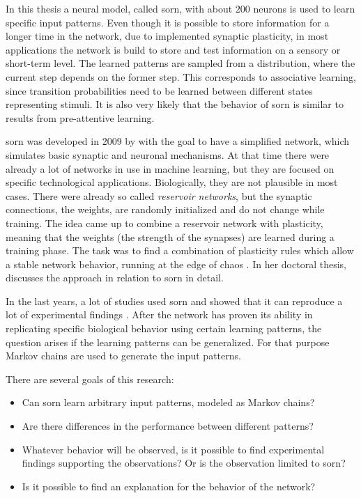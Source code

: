 In this thesis a neural model, called \acf{sorn}, with about $200$ neurons is used to learn specific input patterns. Even though it is possible to store information for a longer time in the network, due to implemented synaptic plasticity, in most applications the network is build to store and test information on a sensory or short-term level. The learned patterns are sampled from a distribution, where the current step depends on the former step. This corresponds to associative learning, since transition probabilities need to be learned between different states representing stimuli. It is also very likely that the behavior of \acs{sorn} is similar to results from pre-attentive learning.

\acs{sorn} was developed in 2009 by \textcite{lazar2009sorn} with the goal to have a simplified network, which simulates basic synaptic and neuronal mechanisms. At that time there were already a lot of networks in use in machine learning, but they are focused on specific technological applications. Biologically, they are not plausible in most cases. There were already so called \emph{reservoir networks}, but the synaptic connections, the weights, are randomly initialized and do not change while training. The idea came up to combine a reservoir network with plasticity, meaning that the weights (the strength of the synapses) are learned during a training phase. The task was to find a combination of plasticity rules which allow a stable network behavior, running at the edge of chaos \parencite{bertschinger2004real}. In her doctoral thesis, \textcite{lazarphd2009self} discusses the approach in relation to \acs{sorn} in detail.

In the last years, a lot of studies used \acs{sorn} and showed that it can reproduce a lot of experimental findings \parencite{lazar2009sorn, zheng2013network, aswolinskiy2015rm, hartmann2015s}. After the network has proven its ability in replicating specific biological behavior using certain learning patterns, the question arises if the learning patterns can be generalized. For that purpose Markov chains are used to generate the input patterns.

There are several goals of this research:

\begin{itemize}
\item Can \acs{sorn} learn arbitrary input patterns, modeled as Markov chains?
\item Are there differences in the performance between different patterns?
\item Whatever behavior will be observed, is it possible to find experimental findings supporting the observations? Or is the observation limited to \acs{sorn}?
\item Is it possible to find an explanation for the behavior of the network?
\end{itemize}

